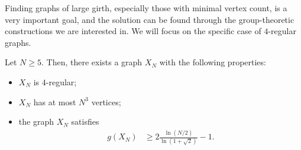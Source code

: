 \documentclass[10pt]{mypackage}
\begin{document}
Finding graphs of large girth, especially those with minimal vertex count, is a very important goal, and the solution can be found through the group-theoretic constructions we are interested in. We will focus on the specific case of $4$-regular graphs.
\begin{theorem}
  Let $N \geq 5$. Then, there exists a graph $X_N$ with the following properties:
  \begin{itemize}
    \item $X_N$ is $4$-regular;
    \item $X_N$ has at most $N^3$ vertices;
    \item the graph $X_N$ satisfies
      \begin{align*}
        g\left( X_N \right) &\geq 2 \frac{\ln\left( N/2 \right)}{\ln\left( 1 + \sqrt{2} \right)} - 1.
      \end{align*}
  \end{itemize}
\end{theorem}
\end{document}
